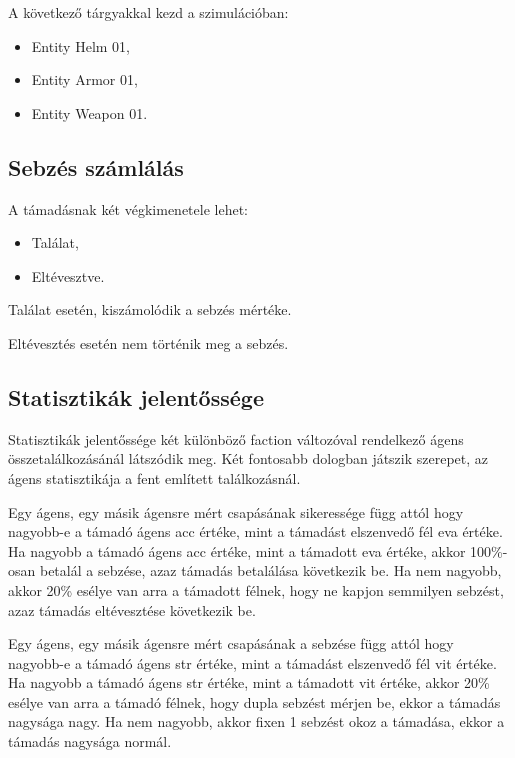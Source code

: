 \noindent A következő tárgyakkal kezd a szimulációban:

\begin{itemize}
    \item Entity Helm 01,
    \item Entity Armor 01,
    \item Entity Weapon 01.
\end{itemize}

\subsection{Sebzés számlálás}

\label{számlálás}

A támadásnak két végkimenetele lehet:

\begin{itemize}
    \item Találat,
    \item Eltévesztve.
\end{itemize}

\noindent Találat esetén, kiszámolódik a sebzés mértéke. 

\noindent Eltévesztés esetén nem történik meg a sebzés. 

\subsection{Statisztikák jelentőssége}

Statisztikák jelentőssége két különböző faction változóval rendelkező ágens összetalálkozásánál látszódik meg.
Két fontosabb dologban játszik szerepet, az ágens statisztikája a fent említett találkozásnál.

Egy ágens, egy másik ágensre mért csapásának sikeressége függ attól hogy nagyobb-e a támadó ágens acc értéke, mint a támadást elszenvedő fél eva értéke.
Ha nagyobb a támadó ágens acc értéke, mint a támadott eva értéke, akkor 100\%-osan betalál a sebzése, azaz támadás betalálása következik be.
Ha nem nagyobb, akkor 20\% esélye van arra a támadott félnek, hogy ne kapjon semmilyen sebzést, azaz támadás eltévesztése következik be.

Egy ágens, egy másik ágensre mért csapásának a sebzése függ attól hogy nagyobb-e a támadó ágens str értéke, mint a támadást elszenvedő fél vit értéke.
Ha nagyobb a támadó ágens str értéke, mint a támadott vit értéke, akkor 20\% esélye van arra a támadó félnek, hogy dupla sebzést mérjen be, ekkor a támadás nagysága nagy.
Ha nem nagyobb, akkor fixen 1 sebzést okoz a támadása, ekkor a támadás nagysága normál.

